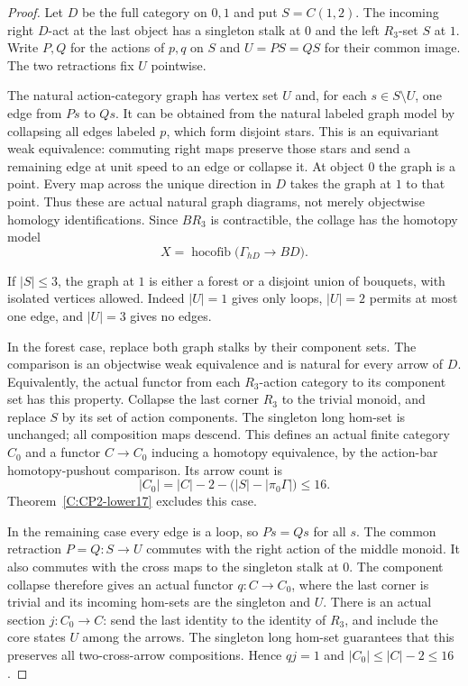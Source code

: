 \begin{proof}
Let $D$ be the full category on $0,1$ and put $S=C(1,2)$.
The incoming right $D$-act at the last object has a singleton
stalk at $0$ and the left $R_3$-set $S$ at $1$. Write $P,Q$
for the actions of $p,q$ on $S$ and $U=PS=QS$ for their
common image. The two retractions fix $U$ pointwise.

The natural action-category graph has vertex set $U$ and,
for each $s\in S\setminus U$, one edge from $Ps$ to $Qs$.
It can be obtained from the natural labeled graph model by
collapsing all edges labeled $p$, which form disjoint stars.
This is an equivariant weak equivalence: commuting right
maps preserve those stars and send a remaining edge at unit
speed to an edge or collapse it. At object $0$ the graph is
a point. Every map across the unique direction in $D$ takes
the graph at $1$ to that point. Thus these are actual natural
graph diagrams, not merely objectwise homology identifications.
Since $BR_3$ is contractible, the collage has the homotopy model
\[
 X=\operatorname{hocofib}\bigl(\Gamma_{hD}\longrightarrow BD\bigr).
\]

If $|S|\leq3$, the graph at $1$ is either a forest or a disjoint
union of bouquets, with isolated vertices allowed. Indeed
$|U|=1$ gives only loops, $|U|=2$ permits at most one edge,
and $|U|=3$ gives no edges.

In the forest case, replace both graph stalks by their component
sets. The comparison is an objectwise weak equivalence and is
natural for every arrow of $D$. Equivalently, the actual functor
from each $R_3$-action category to its component set has this
property. Collapse the last corner $R_3$ to the trivial monoid,
and replace $S$ by its set of action components. The singleton
long hom-set is unchanged; all composition maps descend.
This defines an actual finite category $C_0$ and a functor
$C\to C_0$ inducing a homotopy equivalence, by the action-bar
homotopy-pushout comparison. Its arrow count is
\[
 |C_0|=|C|-2-\bigl(|S|-|\pi_0\Gamma|\bigr)\leq16.
\]
Theorem~\ref{C:CP2-lower17} excludes this case.

In the remaining case every edge is a loop, so $Ps=Qs$ for
all $s$. The common retraction $P=Q:S\to U$ commutes with
the right action of the middle monoid. It also commutes with
the cross maps to the singleton stalk at $0$. The component
collapse therefore gives an actual functor $q:C\to C_0$,
where the last corner is trivial and its incoming hom-sets
are the singleton and $U$. There is an actual section
$j:C_0\to C$: send the last identity to the identity of
$R_3$, and include the core states $U$ among the arrows.
The singleton long hom-set guarantees that this preserves
all two-cross-arrow compositions. Hence $qj=1$ and
$|C_0|\leq|C|-2\leq16$.


\end{proof}

